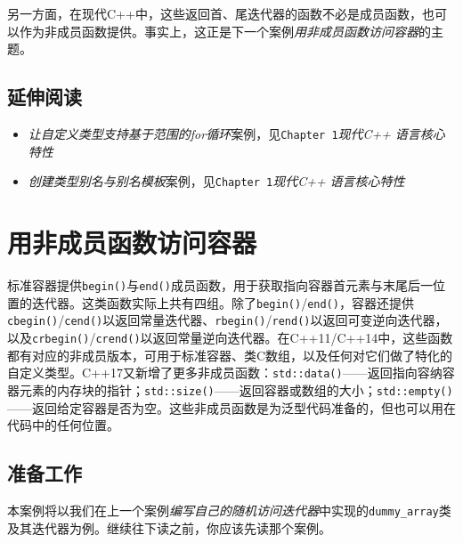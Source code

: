 另一方面，在现代C++中，这些返回首、尾迭代器的函数不必是成员函数，也可以作为非成员函数提供。事实上，这正是下一个案例\textit{用非成员函数访问容器}的主题。



\subsection{延伸阅读}



\begin{itemize}
\item \textit{让自定义类型支持基于范围的for循环}案例，见\texttt{Chapter 1}\textit{现代C++} \textit{语言核心特性}



\item \textit{创建类型别名与别名模板}案例，见\texttt{Chapter 1}\textit{现代C++} \textit{语言核心特性}

\end{itemize}



\section{用非成员函数访问容器}



标准容器提供\texttt{begin()}与\texttt{end()}成员函数，用于获取指向容器首元素与末尾后一位置的迭代器。这类函数实际上共有四组。除了\texttt{begin()}/\texttt{end()}，容器还提供\texttt{cbegin()}/\texttt{cend()}以返回常量迭代器、\texttt{rbegin()}/\texttt{rend()}以返回可变逆向迭代器，以及\texttt{crbegin()}/\texttt{crend()}以返回常量逆向迭代器。在C++11/C++14中，这些函数都有对应的非成员版本，可用于标准容器、类C数组，以及任何对它们做了特化的自定义类型。C++17又新增了更多非成员函数：\texttt{std::\allowbreak{}data()}——返回指向容纳容器元素的内存块的指针；\texttt{std::\allowbreak{}size()}——返回容器或数组的大小；\texttt{std::\allowbreak{}empty()}——返回给定容器是否为空。这些非成员函数是为泛型代码准备的，但也可以用在代码中的任何位置。



\subsection{准备工作}



本案例将以我们在上一个案例\textit{编写自己的随机访问迭代器}中实现的\texttt{dummy\_\allowbreak{}array}类及其迭代器为例。继续往下读之前，你应该先读那个案例。


